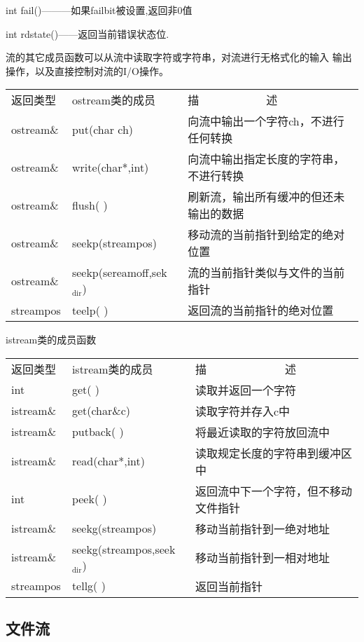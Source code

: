 \documentclass{article}
\begin{document}
int fail()---------如果failbit被设置,返回非0值

int rdstate()------返回当前错误状态位.

流的其它成员函数可以从流中读取字符或字符串，对流进行无格式化的输入 输出操作，以及直接控制对流的I/O操作。

\begin{center}
\begin{tabular}{lll}
返回类型 & ostream类的成员 & 描　　　　　　述\\
ostream\& & put(char ch) & 向流中输出一个字符ch，不进行任何转换\\
ostream\& & write(char*,int) & 向流中输出指定长度的字符串，不进行转换\\
ostream\& & flush( ) & 刷新流，输出所有缓冲的但还未输出的数据\\
ostream\& & seekp(streampos) & 移动流的当前指针到给定的绝对位置\\
ostream\& & seekp(sereamoff,sek$_{\text{dir}}$) & 流的当前指针类似与文件的当前指针\\
streampos & teelp( ) & 返回流的当前指针的绝对位置\\
\end{tabular}
\end{center}

istream类的成员函数

\begin{center}
\begin{tabular}{lll}
返回类型 & istream类的成员 & 描　　　　　　　述\\
int & get( ) & 读取并返回一个字符\\
istream\& & get(char\&c) & 读取字符并存入c中\\
istream\& & putback( ) & 将最近读取的字符放回流中\\
istream\& & read(char*,int) & 读取规定长度的字符串到缓冲区中\\
int & peek( ) & 返回流中下一个字符，但不移动文件指针\\
istream\& & seekg(streampos) & 移动当前指针到一绝对地址\\
istream\& & seekg(streampos,seek$_{\text{dir}}$) & 移动当前指针到一相对地址\\
streampos & tellg( ) & 返回当前指针\\
\end{tabular}
\end{center}
\subsection{文件流}
\label{sec-10-5}
\end{document}
